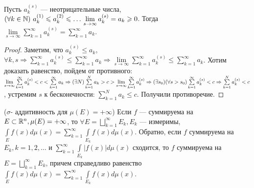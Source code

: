 \begin{lemma}
	Пусть $a_k^{(s)}$ --- неотрицательные числа, $(\forall k\in \N)\ a_k^{(1)}\leqslant a_k^{(2)}\leqslant \ldots \\ \lim\limits_{s\to\infty}a_k^{(s)}=a_k \geqslant0$.
	Тогда $\lim\limits_{s\to\infty}\sum\limits_{k=1}^\infty a_k^{(s)}=\sum\limits_{k=1}^\infty a_k$.
\end{lemma}

\begin{proof}
	Заметим, что $a_k^{(s)}\leqslant a_k$, $\forall k, s \Rightarrow\sum\limits_{k=1}^\infty a_k^{(s)} \leqslant \sum\limits_{k=1}^\infty a_k \Rightarrow \lim\limits_{s\to\infty}\sum\limits_{k=1}^\infty a_k^{(s)}\leqslant \sum\limits_{k=1}^\infty a_k$. Хотим доказать равенство, пойдем от противного: $\lim\limits_{s\to\infty}\sum\limits_{k=1}^\infty a_k^{(s)}< c <\sum\limits_{k=1}^\infty a_k \Rightarrow \\ (\exists N)\sum\limits_{k=1}^N a_k >c> \lim\limits_{s\to\infty} \sum\limits_{k=1}^\infty a_k^{(s)}\Rightarrow (\exists s_0)(\forall s>s_0)\sum\limits_{k=1}^\infty a_k^{(s)}<c\Rightarrow \sum\limits_{k=1}^N a_k^{(s)}<c$, устремим $s$ к бесконечности: $\sum\limits_{k=1}^N a_k \leqslant c$. Получили противоречие.
\end{proof}

\begin{prop}($\sigma$- аддитивность для $\mu(E)=+\infty$)
	Если $f$ --- суммируема на $E\subset \R^n, \mu(E)=+\infty$, то $\forall E=\bigsqcup\limits_{k=1}^\infty E_k, E_k$ --- измеримы, $\int\limits_{E}f(x)d\mu(x)=\sum\limits_{k=1}^\infty \int\limits_{E_k}f(x)d\mu(x)$. Обратно, если $f$ суммируема на $E_k, k=1,2,\ldots$ и $\sum\limits_{k=1}^\infty\int\limits_{E_k}|f(x)|d\mu(x)$ сходится, то $f$ суммируема на $E=\bigsqcup\limits_{k=1}^\infty E_k$, причем справедливо равенство $\int\limits_{E}f(x)d\mu(x)=\sum\limits_{k=1}^\infty \int\limits_{E_k}f(x)d\mu(x)$.
\end{prop}




